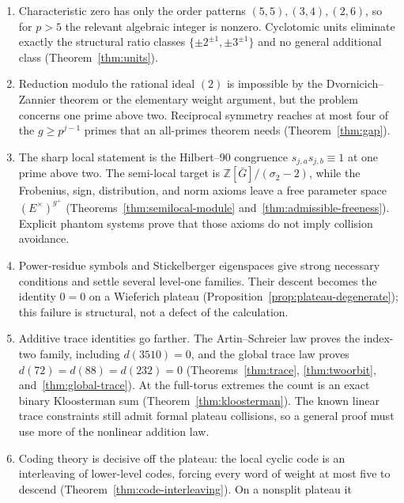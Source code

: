 \documentclass[a4paper]{article}
\newcommand{\Z}{\mathbb{Z}}
\begin{document}
\begin{enumerate}
	      and the trace-one condition is exactly the original incidence
	      (Theorems~\ref{thm:sp4-equivalence} and~\ref{thm:sp4-tori}).
	\item Characteristic zero has only the order patterns
	      $(5,5),(3,4),(2,6)$, so for $p>5$ the relevant algebraic integer
	      is nonzero.  Cyclotomic units eliminate exactly the structural
	      ratio classes $\{\pm2^{\pm1},\pm3^{\pm1}\}$ and no general
	      additional class (Theorem~\ref{thm:units}).
	\item Reduction modulo the rational ideal $(2)$ is impossible by the
	      Dvornicich--Zannier theorem or the elementary weight argument,
	      but the problem concerns one prime above two.  Reciprocal
	      symmetry reaches at most four of the
	      $g\geq p^{j-1}$ primes that an all-primes theorem needs
	      (Theorem~\ref{thm:gap}).
	\item The sharp local statement is the Hilbert--90 congruence
	      $s_{j,a}s_{j,b}\equiv1$ at one prime above two.  The semi-local
	      target is
	      $\Z[\bar G]/(\sigma_2-2)$, while the Frobenius, sign,
	      distribution, and norm axioms leave a free parameter space
	      $(E^\times)^{g^+}$ (Theorems~\ref{thm:semilocal-module}
	      and~\ref{thm:admissible-freeness}).  Explicit phantom systems
	      prove that those axioms do not imply collision avoidance.
	\item Power-residue symbols and Stickelberger eigenspaces give strong
	      necessary conditions and settle several level-one families.
	      Their descent becomes the identity $0=0$ on a Wieferich plateau
	      (Proposition~\ref{prop:plateau-degenerate}); this failure is
	      structural, not a defect of the calculation.
	\item Additive trace identities go farther.  The Artin--Schreier law
	      proves the index-two family, including $d(3510)=0$, and the
	      global trace law proves
	      $d(72)=d(88)=d(232)=0$
	      (Theorems~\ref{thm:trace}, \ref{thm:twoorbit},
	      and~\ref{thm:global-trace}).  At the full-torus extremes the
	      count is an exact binary Kloosterman sum
	      (Theorem~\ref{thm:kloosterman}).  The known linear trace
	      constraints still admit formal plateau collisions, so a general
	      proof must use more of the nonlinear addition law.
	\item Coding theory is decisive off the plateau: the local cyclic code
	      is an interleaving of lower-level codes, forcing every word of
	      weight at most five to descend
	      (Theorem~\ref{thm:code-interleaving}).  On a nonsplit plateau it

\end{enumerate}
\end{document}
